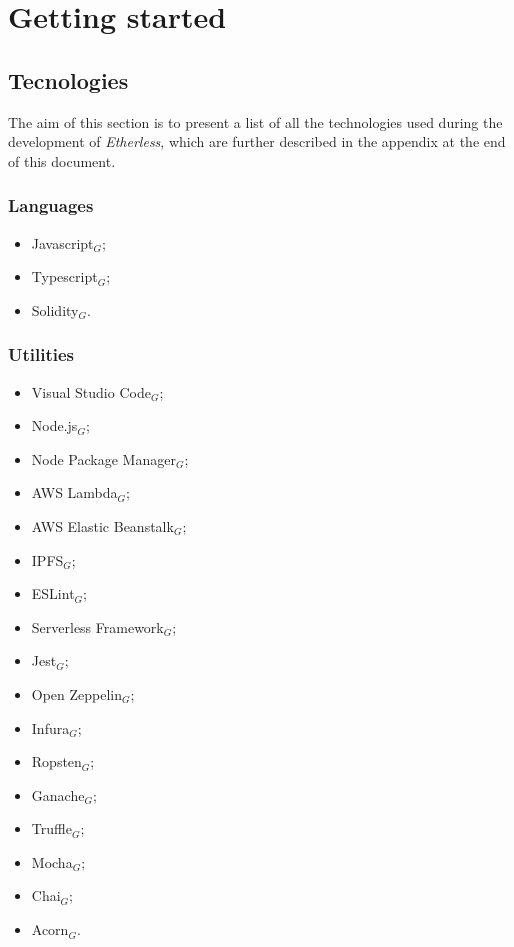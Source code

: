 \section{Getting started}
\subsection{Tecnologies}
The aim of this section is to present a list of all the technologies used during the development of \textit{Etherless}, which are further described in the appendix at the end of this document.
\subsubsection{Languages}
\begin{itemize}
	\item Javascript$_{G}$;
	\item Typescript$_{G}$;
	\item Solidity$_{G}$.
\end{itemize}
\subsubsection{Utilities}
\begin{itemize}
	\item Visual Studio Code$_{G}$;
	\item Node.js$_{G}$;
	\item Node Package Manager$_{G}$;
	\item AWS Lambda$_{G}$;
	\item AWS Elastic Beanstalk$_{G}$;
	\item IPFS$_{G}$;
	\item ESLint$_{G}$;
	\item Serverless Framework$_{G}$;
	\item Jest$_{G}$;
	\item Open Zeppelin$_{G}$;
	\item Infura$_{G}$;
	\item Ropsten$_{G}$;
	\item Ganache$_{G}$;
	\item Truffle$_{G}$;
	\item Mocha$_{G}$;
	\item Chai$_{G}$;
	\item Acorn$_{G}$.
\end{itemize}
\pagebreak
